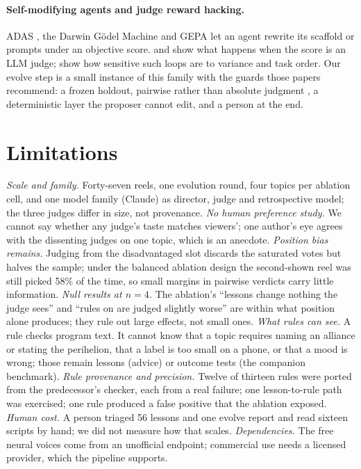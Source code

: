 \documentclass[11pt]{article}
\begin{document}
\paragraph{Self-modifying agents and judge reward hacking.} ADAS \citep{adas2024}, the Darwin G\"odel
Machine \citep{dgm2025} and GEPA \citep{gepa2025} let an agent rewrite its scaffold or prompts under
an objective score. \citet{notanoracle2026} and \citet{moreconvincing2026} show what happens when the
score is an LLM judge; \citet{fragility2026} show how sensitive such loops are to variance and task
order. Our evolve step is a small instance of this family with the guards those papers recommend: a
frozen holdout, pairwise rather than absolute judgment \citep{mtbench2023}, a deterministic layer the
proposer cannot edit, and a person at the end.

\section{Limitations}
\label{sec:limits}
\emph{Scale and family.} Forty-seven reels, one evolution round, four topics per ablation cell, and one
model family (Claude) as director, judge and retrospective model; the three judges differ in size, not
provenance. \emph{No human preference study.} We cannot say whether any judge's taste matches viewers';
one author's eye agrees with the dissenting judges on one topic, which is an anecdote. \emph{Position
bias remains.} Judging from the disadvantaged slot discards the saturated votes but halves the sample;
under the balanced ablation design the second-shown reel was still picked 58\% of the time, so small
margins in pairwise verdicts carry little information. \emph{Null results at $n=4$.} The
ablation's ``lessons change nothing the judge sees'' and ``rules on are judged slightly worse'' are
within what position alone produces; they rule out large effects, not small ones. \emph{What rules can
see.} A rule checks program text. It cannot know that a topic requires naming an alliance or stating
the perihelion, that a label is too small on a phone, or that a mood is wrong; those remain lessons
(advice) or outcome tests (the companion benchmark). \emph{Rule provenance and precision.} Twelve of
thirteen rules were ported from the predecessor's checker, each from a real failure; one
lesson-to-rule path was exercised; one rule produced a false positive that the ablation exposed.
\emph{Human cost.} A person triaged 56 lessons and one evolve report and read sixteen scripts by
hand; we did not measure how that scales. \emph{Dependencies.} The free neural voices come from an
unofficial endpoint; commercial use needs a licensed provider, which the pipeline supports.
\end{document}
